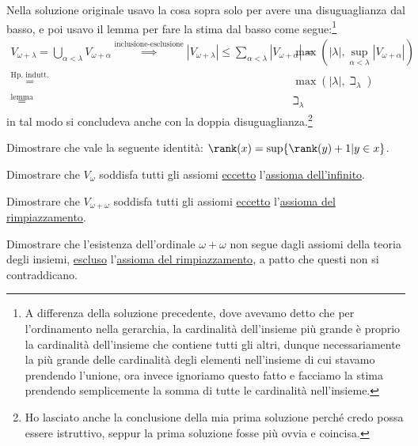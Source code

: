 \documentclass[11pt]{scrartcl}
\begin{document}
\begin{soln}
\begin{itemize}
\[			\]
		Nella soluzione originale usavo la cosa sopra solo per avere una disuguaglianza dal basso, e poi usavo il lemma per fare la stima dal basso come segue:\footnote{A differenza della soluzione precedente, dove avevamo detto che
		per l'ordinamento nella gerarchia, la cardinalità dell'insieme più grande è proprio la cardinalità dell'insieme che contiene tutti gli altri, dunque necessariamente la più grande delle cardinalità degli elementi nell'insieme di cui stavamo prendendo l'unione,
		ora invece ignoriamo questo fatto e facciamo la stima prendendo semplicemente la somma di tutte le cardinalità nell'insieme.}
		\[ \begin{split}
			V_{\omega + \lambda} = \bigcup_{\alpha < \lambda} V_{\omega + \alpha} \overset{\text{inclusione-esclusione}}{\implies} |V_{\omega + \lambda}| \leq \sum_{\alpha < \lambda} |V_{\omega + \alpha}| =& \max\left(|\lambda|,\sup_{\alpha < \lambda} |V_{\omega + \alpha}|\right) \\
																																																			 \overset{\text{Hp. indutt.}}{=}& \max(|\lambda|,\beth_\lambda) \\
																																																			 \overset{\text{lemma}}{=}& \beth_\lambda
		\end{split}
			\]
		in tal modo si concludeva anche con la doppia disuguaglianza.\footnote{Ho lasciato anche la conclusione della mia prima soluzione perché credo possa essere istruttivo, seppur la prima soluzione fosse più ovvia e coincisa.}
	\end{itemize}
\end{soln}

\begin{exercise}
	Dimostrare che vale la seguente identità: $\rank(x) = \sup\{\rank(y) + 1 | y \in x\}$.
\end{exercise}

\begin{exercise}[$V_\omega$]
	Dimostrare che $V_\omega$ soddisfa tutti gli assiomi \underline{eccetto} l'\hyperref[ax7]{assioma dell'infinito}.
\end{exercise}

\begin{exercise}
	Dimostrare che $V_{\omega + \omega}$ soddisfa tutti gli assiomi \underline{eccetto} l'\hyperref[ax8]{assioma del rimpiazzamento}.
\end{exercise}

\begin{exercise}
	Dimostrare che l'esistenza dell'ordinale $\omega + \omega$ non segue dagli assiomi della teoria degli insiemi, \underline{escluso} l'\hyperref[ax8]{assioma del rimpiazzamento}, a patto 
	che questi non si contraddicano.
\end{exercise}
\end{document}
